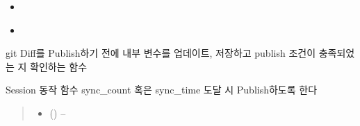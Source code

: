 \documentclass[a4paper,10pt,english]{sphinxmanual}
\begin{document}
\begin{fulllineitems}
\begin{fulllineitems}
\nopagebreak

\begin{itemize}
\item {} 
\sphinxAtStartPar
{\hyperref[\detokenize{_Session:Session._reset_count}]{}}

\item {} 
\sphinxAtStartPar
{\hyperref[\detokenize{_Session:Session.extractGitDiff}]{}}

\end{itemize}



\end{fulllineitems}


\begin{fulllineitems}
\label{\detokenize{_Session:Session.prePublish}}
\pysigstartsignatures
{}
\pysigstopsignatures
\sphinxAtStartPar
git Diff를 Publish하기 전에 내부 변수를 업데이트, 저장하고 publish 조건이 충족되었는 지 확인하는 함수

\end{fulllineitems}


\begin{fulllineitems}
\label{\detokenize{_Session:Session.run}}
\pysigstartsignatures
{}
\pysigstopsignatures
\sphinxAtStartPar
Session 동작 함수
sync\_count 혹은 sync\_time 도달 시 Publish하도록 한다
\begin{quote}\begin{description}
\begin{itemize}
\item {} 
\sphinxAtStartPar
{} ({\hyperref[\detokenize{_Session:Session}]{}}) – 

\end{itemize}

\end{description}\end{quote}

\end{fulllineitems}


\end{fulllineitems}
\end{document}
